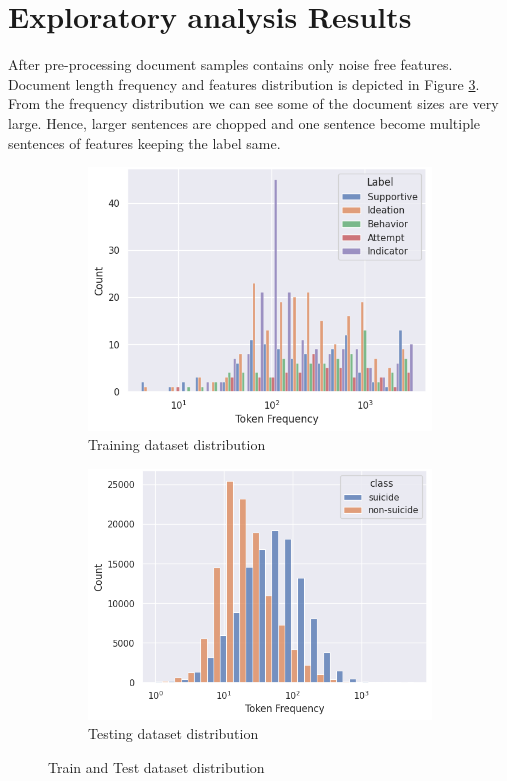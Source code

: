 \documentclass[sn-mathphys,Numbered]{sn-jnl}%
\theoremstyle{thmstyleone}%
\theoremstyle{thmstyletwo}%
\theoremstyle{thmstylethree}%
\begin{document}
\section{Exploratory analysis Results}
\label{exp_anal}
After pre-processing document samples contains only noise free features. Document length frequency and features distribution is depicted in Figure \ref{redditdist_twitterdist_together}. From the frequency distribution we can see some of the document sizes are very large. Hence, larger sentences are chopped and one sentence become multiple sentences of features keeping the label same. 
\begin{figure}[H]
\centering
\begin{subfigure}{0.45\textwidth}
    \includegraphics[width=\textwidth]{reddit_dist.png}
    \caption{Training dataset distribution}
    \label{redditdist}
\end{subfigure}
\hfill
\begin{subfigure}{0.45\textwidth}
    \includegraphics[width=\textwidth]{twitterdist.png}
    \caption{Testing dataset distribution}
    \label{twitterdist}
\end{subfigure}       
\caption{Train and Test dataset distribution}
\label{redditdist_twitterdist_together}
\end{figure}
\end{document}
